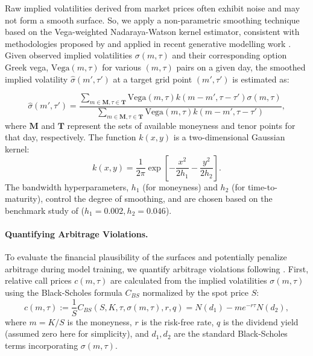 \documentclass{article}
\begin{document}
Raw implied volatilities derived from market prices often exhibit noise and may not form a smooth surface. So, we apply a non-parametric smoothing technique based on the Vega-weighted Nadaraya-Watson kernel estimator, consistent with methodologies proposed by \citet{Cont_Da_Fonseca_2002} and applied in recent generative modelling work \citep{Vuletić_Cont_2024}. Given observed implied volatilities $\sigma(m, \tau)$ and their corresponding option Greek vega, $\text{Vega}(m, \tau)$ for various $(m, \tau)$ pairs on a given day, the smoothed implied volatility $\hat{\sigma}(m', \tau')$ at a target grid point $(m', \tau')$ is estimated as:

\begin{equation} \label{eq:kernel_smoothing}
\hat{\sigma}(m', \tau') = \frac{\sum_{m \in \mathbf{M}, \tau \in \mathbf{T}} \text{Vega}(m, \tau) k(m - m', \tau - \tau') \sigma(m, \tau)}{\sum_{m \in \mathbf{M}, \tau \in \mathbf{T}} \text{Vega}(m, \tau) k(m - m', \tau - \tau')},
\end{equation}
where $\mathbf{M}$ and $\mathbf{T}$ represent the sets of available moneyness and tenor points for that day, respectively. The function $k(x, y)$ is a two-dimensional Gaussian kernel:
\begin{equation} \label{eq:gaussian_kernel}
k(x, y) = \frac{1}{2\pi} \exp\left[-\frac{x^2}{2h_1} - \frac{y^2}{2h_2}\right].
\end{equation}
The bandwidth hyperparameters, $h_1$ (for moneyness) and $h_2$ (for time-to-maturity), control the degree of smoothing, and are chosen based on the benchmark study of \citep{Vuletić_Cont_2024} ($h_1 = 0.002, h_2 = 0.046$).

\paragraph{Quantifying Arbitrage Violations.} To evaluate the financial plausibility of the surfaces and potentially penalize arbitrage during model training, we quantify arbitrage violations following \citet{Vuletić_Cont_2024}. First, relative call prices $c(m, \tau)$ are calculated from the implied volatilities $\sigma(m, \tau)$ using the Black-Scholes formula $C_{BS}$ normalized by the spot price $S$:
\begin{equation}
c(m, \tau) := \frac{1}{S} C_{BS}(S, K, \tau, \sigma(m, \tau), r, q) = N(d_1) - m e^{-r\tau} N(d_2),
\end{equation}
where $m=K/S$ is the moneyness, $r$ is the risk-free rate, $q$ is the dividend yield (assumed zero here for simplicity), and $d_1, d_2$ are the standard Black-Scholes terms incorporating $\sigma(m, \tau)$.
\end{document}
